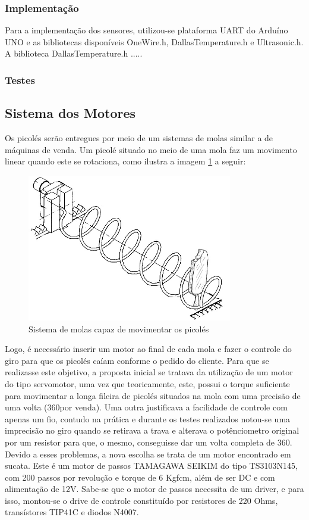 \subsubsection{Implementação}

Para a implementação dos sensores, utilizou-se plataforma UART do Arduíno UNO e as bibliotecas disponíveis OneWire.h, DallasTemperature.h e Ultrasonic.h. A biblioteca DallasTemperature.h .....

\subsubsection{Testes}

\subsection{Sistema dos Motores}
Os picolés serão entregues por meio de um sistemas de molas similar a de máquinas de venda. Um picolé situado no meio de uma mola faz um movimento linear quando este se rotaciona, como ilustra a imagem \ref{fig:sistema_molas} a seguir:

\begin{figure}[H]
	\centering
    \includegraphics[width=0.8\textwidth]{figuras/sistema_molas}
    \caption{Sistema de molas capaz de movimentar os picolés}
    \label{fig:sistema_molas}
\end{figure}

Logo, é necessário inserir um motor ao final de cada mola e fazer o controle do giro para que os picolés caíam conforme o pedido do cliente. Para que se realizasse este objetivo, a proposta inicial se tratava da utilização de um motor do tipo servomotor, uma vez que teoricamente, este, possui o torque suficiente para movimentar a longa fileira de picolés situados na mola com uma precisão de uma volta (360\degree por venda). Uma outra justificava a facilidade de controle com apenas um fio, contudo na prática e durante os testes realizados notou-se uma imprecisão no giro quando se retirava a trava e alterava o potênciometro original por um resistor para que, o mesmo, conseguisse dar um volta completa de 360\degree. Devido a esses problemas, a nova escolha se trata de um motor encontrado em sucata. Este é um motor de passos TAMAGAWA SEIKIM do tipo TS3103N145, com 200 passos por revolução e torque de 6 Kgfcm, além de ser DC e com alimentação de 12V.
Sabe-se que o motor de passos necessita de um driver, e para isso, montou-se o drive de controle constituído por resistores de 220 Ohms, transístores TIP41C e diodos N4007.

